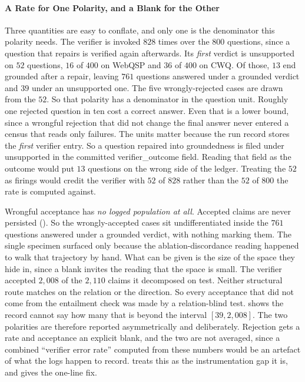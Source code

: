 \paragraph{A Rate for One Polarity, and a Blank for the Other}

Three quantities are easy to conflate, and only one is the denominator this
polarity needs. The verifier is invoked $828$ times over the $800$ questions,
since a question that repairs is verified again afterwards. Its \emph{first}
verdict is \textsf{unsupported} on $52$ questions, $16$ of $400$ on WebQSP and
$36$ of $400$ on CWQ. Of those, $13$ end \textsf{grounded} after a repair,
leaving $761$ questions answered under a grounded verdict and $39$ under an
unsupported one. The five wrongly-rejected cases are drawn from the $52$. So
that polarity has a denominator in the question unit. Roughly one rejected
question in ten cost a correct answer. Even that is a lower bound, since a
wrongful rejection that did not change the final answer never entered a census
that reads only failures. The units matter because the run record stores the
\emph{first} verifier entry. So a question repaired into groundedness is filed
under \textsf{unsupported} in the committed \textsf{verifier\_outcome} field.
Reading that field as the outcome would put $13$ questions on the wrong side of
the ledger. Treating the $52$ as firings would credit the verifier with $52$ of
$828$ rather than the $52$ of $800$ the rate is computed against.

Wrongful acceptance has \emph{no logged population at all}. Accepted claims are
never persisted (). So the wrongly-accepted cases sit
undifferentiated inside the $761$ questions answered under a grounded verdict,
with nothing marking them. The single specimen surfaced only because the
ablation-discordance reading happened to walk that trajectory by hand. What can
be given is the size of the space they hide in, since a blank invites the
reading that the space is small. The verifier accepted $2{,}008$ of the
$2{,}110$ claims it decomposed on test. Neither structural route matches on the
relation or the direction. So every acceptance that did not come from the
entailment check was made by a relation-blind test. 
shows the record cannot say how many that is beyond the interval $[39,
2{,}008]$. The two polarities are therefore reported asymmetrically and
deliberately. Rejection gets a rate and acceptance an explicit blank, and the
two are not averaged, since a combined ``verifier error rate'' computed from
these numbers would be an artefact of what the logs happen to record.
 treats this as the instrumentation gap it is, and
 gives the one-line fix.

